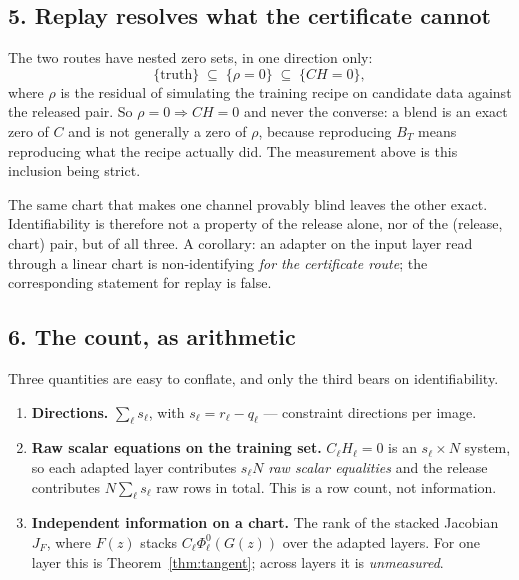 \subsection*{5. Replay resolves what the certificate cannot}

The two routes have nested zero sets, in one direction only:
\[
  \{\text{truth}\}\;\subseteq\;\{\rho=0\}\;\subseteq\;\{CH=0\},
\]
where $\rho$ is the residual of simulating the training recipe on candidate data against the released
pair. So $\rho=0\Rightarrow CH=0$ and never the converse: a blend is an exact zero of $C$ and is not
generally a zero of $\rho$, because reproducing $B_T$ means reproducing what the recipe actually did.
The measurement above is this inclusion being strict.

\begin{remark}
The same chart that makes one channel provably blind leaves the other exact. Identifiability is
therefore not a property of the release alone, nor of the (release, chart) pair, but of all three.
A corollary: an adapter on the input layer read through a linear chart is non-identifying
\emph{for the certificate route}; the corresponding statement for replay is false.
\end{remark}

\subsection*{6. The count, as arithmetic}

Three quantities are easy to conflate, and only the third bears on identifiability.

\begin{enumerate}
\item \textbf{Directions.} $\sum_\ell s_\ell$, with $s_\ell=r_\ell-q_\ell$ --- constraint directions
      per image.
\item \textbf{Raw scalar equations on the training set.} $C_\ell H_\ell=0$ is an $s_\ell\times N$
      system, so each adapted layer contributes $s_\ell N$ \emph{raw scalar equalities} and the release
      contributes $N\sum_\ell s_\ell$ raw rows in total. This is a row count, not information.
\item \textbf{Independent information on a chart.} The rank of the stacked Jacobian $J_F$, where
      $F(z)$ stacks $C_\ell\Phi^0_\ell(G(z))$ over the adapted layers. For one layer this is
      Theorem~\ref{thm:tangent}; across layers it is \emph{unmeasured}.
\end{enumerate}

